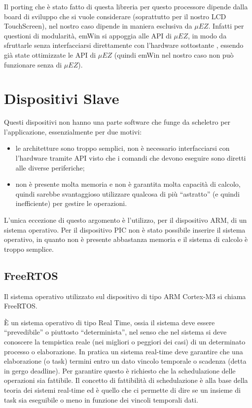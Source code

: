 \documentclass[a4paper,titlepage]{book}
\newcommand{\itema}{\begin{itemize}[noitemsep,topsep=10pt,parsep=5pt,partopsep=10pt]}
\begin{document}
Il porting che è stato fatto di questa libreria per questo processore dipende dalla board di sviluppo che si vuole considerare (soprattutto per il nostro LCD TouchScreen), nel nostro caso dipende in maniera esclusiva da $\mu EZ$. Infatti per questioni di modularità, emWin si appoggia alle API di $\mu EZ$, in modo da sfruttarle senza interfacciarsi direttamente con l'hardware sottostante , essendo già state ottimizzate le API di $\mu EZ$ (quindi emWin nel nostro caso non può funzionare senza di $\mu EZ$).
 
\section{Dispositivi Slave}

Questi dispositivi non hanno una parte software che funge da scheletro per l'applicazione, essenzialmente per due motivi:

\itema

\item le architetture sono troppo semplici, non è necessario interfacciarsi con l'hardware tramite API visto che i comandi che devono eseguire sono diretti alle diverse periferiche;
\item non è presente molta memoria e non è garantita molta capacità di calcolo, quindi sarebbe svantaggioso utilizzare qualcosa di più ``astratto'' (e quindi inefficiente) per gestire le operazioni.

\end{itemize}

L'unica eccezione di questo argomento è l'utilizzo, per il dispositivo ARM, di un sistema operativo. Per il dispositivo PIC non è stato possibile inserire il sistema operativo, in quanto non è presente abbastanza memoria e il sistema di calcolo è troppo semplice.

\subsection{FreeRTOS}

Il sistema operativo utilizzato sul dispositivo di tipo ARM Cortex-M3 si chiama FreeRTOS. 

È un sistema operativo di tipo Real Time, ossia  il sistema deve essere ``prevedibile'' o piuttosto ``determinista'', nel senso che nel sistema si deve conoscere la tempistica reale (nei migliori o peggiori dei casi) di un determinato processo o elaborazione. In pratica un sistema real-time deve garantire che una elaborazione (o task) termini entro un dato vincolo temporale o scadenza (detta in gergo deadline). Per garantire questo è richiesto che la schedulazione delle operazioni sia fattibile. Il concetto di fattibilità di schedulazione è alla base della teoria dei sistemi real-time ed è quello che ci permette di dire se un insieme di task sia eseguibile o meno in funzione dei vincoli temporali dati.
\end{document}

